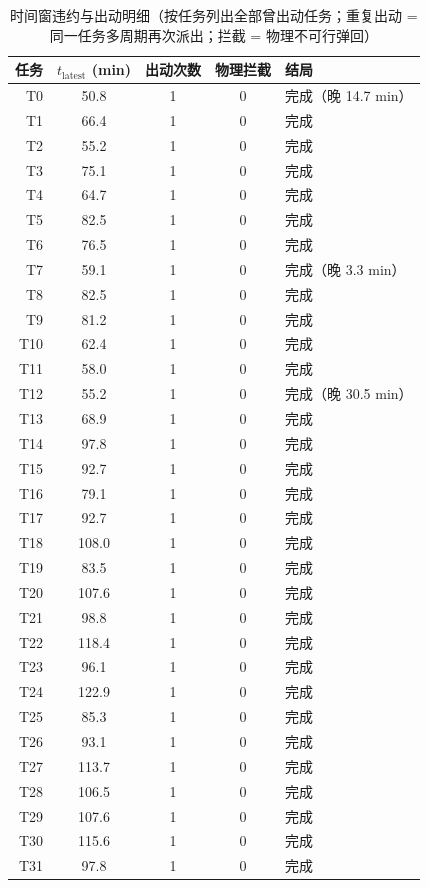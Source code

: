 \documentclass[a4paper,11pt]{article}
\begin{document}
\begin{table}[htbp]\centering
\caption{时间窗违约与出动明细（按任务列出全部曾出动任务；重复出动 = 同一任务多周期再次派出；拦截 = 物理不可行弹回）}
\label{tab:exp01-tw}
\begin{tabular}{rcccl}
\toprule
任务 & $t_{\mathrm{latest}}$ (min) & 出动次数 & 物理拦截 & 结局 \\
\midrule
T0 & 50.8 & 1 & 0 & 完成（晚 14.7 min） \\
T1 & 66.4 & 1 & 0 & 完成 \\
T2 & 55.2 & 1 & 0 & 完成 \\
T3 & 75.1 & 1 & 0 & 完成 \\
T4 & 64.7 & 1 & 0 & 完成 \\
T5 & 82.5 & 1 & 0 & 完成 \\
T6 & 76.5 & 1 & 0 & 完成 \\
T7 & 59.1 & 1 & 0 & 完成（晚 3.3 min） \\
T8 & 82.5 & 1 & 0 & 完成 \\
T9 & 81.2 & 1 & 0 & 完成 \\
T10 & 62.4 & 1 & 0 & 完成 \\
T11 & 58.0 & 1 & 0 & 完成 \\
T12 & 55.2 & 1 & 0 & 完成（晚 30.5 min） \\
T13 & 68.9 & 1 & 0 & 完成 \\
T14 & 97.8 & 1 & 0 & 完成 \\
T15 & 92.7 & 1 & 0 & 完成 \\
T16 & 79.1 & 1 & 0 & 完成 \\
T17 & 92.7 & 1 & 0 & 完成 \\
T18 & 108.0 & 1 & 0 & 完成 \\
T19 & 83.5 & 1 & 0 & 完成 \\
T20 & 107.6 & 1 & 0 & 完成 \\
T21 & 98.8 & 1 & 0 & 完成 \\
T22 & 118.4 & 1 & 0 & 完成 \\
T23 & 96.1 & 1 & 0 & 完成 \\
T24 & 122.9 & 1 & 0 & 完成 \\
T25 & 85.3 & 1 & 0 & 完成 \\
T26 & 93.1 & 1 & 0 & 完成 \\
T27 & 113.7 & 1 & 0 & 完成 \\
T28 & 106.5 & 1 & 0 & 完成 \\
T29 & 107.6 & 1 & 0 & 完成 \\
T30 & 115.6 & 1 & 0 & 完成 \\
T31 & 97.8 & 1 & 0 & 完成 \\

\end{tabular}
\end{table}
\end{document}
